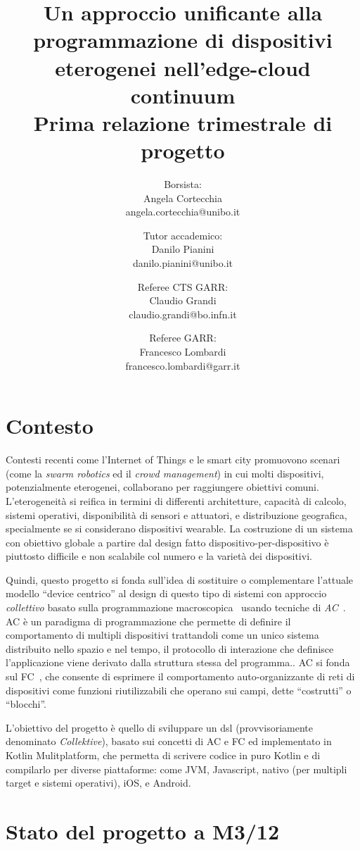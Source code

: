 \documentclass[13pt, a4paper]{article}
\title{\LARGE
    Un approccio unificante alla programmazione di dispositivi eterogenei nell'edge-cloud continuum \\ \small Prima relazione trimestrale di progetto
}
\author{
   Borsista: \\Angela Cortecchia \\ \small angela.cortecchia@unibo.it
    \and
    Tutor accademico: \\Danilo Pianini \\ \small danilo.pianini@unibo.it
    \and
    Referee CTS GARR: \\Claudio Grandi \\ \small claudio.grandi@bo.infn.it
    \and
    Referee GARR: \\Francesco Lombardi \\ \small francesco.lombardi@garr.it
}
\newcommand{\ck}{\emph{Collektive}}
\begin{document}
\maketitle
\clearpage


\section{Contesto}
\label{sec:context}

Contesti recenti come l'Internet of Things e le smart city promuovono scenari
(come la \emph{swarm robotics} ed il \emph{crowd management})
in cui molti dispositivi,
potenzialmente eterogenei, collaborano per raggiungere obiettivi comuni.
%
L'eterogeneità si reifica in termini di differenti architetture,
capacità di calcolo,
sistemi operativi,
disponibilità di sensori e attuatori,
e distribuzione geografica,
specialmente se si considerano dispositivi wearable.
%
La costruzione di un sistema con obiettivo globale a partire dal design fatto dispositivo-per-dispositivo
è piuttosto difficile e non scalabile col numero e la varietà dei dispositivi.

Quindi,
questo progetto si fonda sull'idea di sostituire o complementare l'attuale modello ``device centrico'' al design di questo tipo di sistemi
con approccio \emph{collettivo} basato sulla programmazione macroscopica~\cite{casadei, JLAMP2019}
usando tecniche di \emph{\ac{AC}}~\cite{BealIEEEComputer2015}.
%
\ac{AC} è un paradigma di programmazione che permette di definire il comportamento di multipli dispositivi trattandoli
come un unico sistema distribuito nello spazio e nel tempo,
il protocollo di interazione che definisce l'applicazione viene derivato dalla struttura stessa del programma..
%
\ac{AC} si fonda sul \ac{FC}~\cite{a-higher-order-calculus-of-computational-fields(TOCL)},
che consente di esprimere il comportamento auto-organizzante di reti
di dispositivi come funzioni riutilizzabili che operano sui campi, dette ``costrutti'' o ``blocchi''.

L'obiettivo del progetto è quello di sviluppare un
\ac{dsl} (provvisoriamente denominato \ck{}),
basato sui concetti di \ac{AC} e \ac{FC} ed implementato in Kotlin Mulitplatform,
che permetta di scrivere codice in puro Kotlin e di compilarlo per diverse piattaforme:
come \ac{JVM}, Javascript, nativo (per multipli target e sistemi operativi), iOS, e Android.

\section{Stato del progetto a M3/12}\label{sec:obiettivi-raggiunti}
\end{document}
